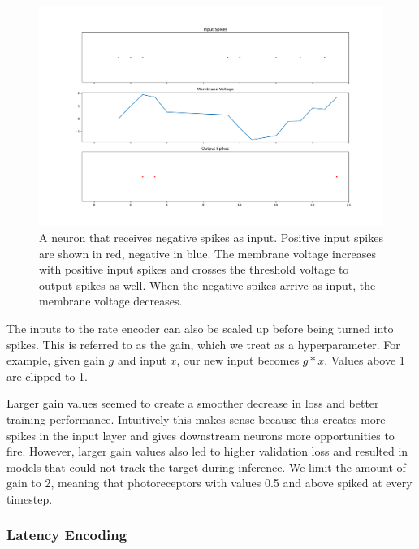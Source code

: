 \documentclass [MS] {UCLAthesis}
\begin{document}
\begin{figure}
    \centering
    \includegraphics[width=\textwidth]{negative_spike_example}
    \caption[Negative spike inputs to a LIF neuron]{A neuron that receives negative spikes as input. Positive input spikes are shown in red, negative in blue. The membrane voltage increases with positive input spikes and crosses the threshold voltage to output spikes as well. When the negative spikes arrive as input, the membrane voltage decreases.}
    \label{fig:negative_spike_example}
\end{figure}

The inputs to the rate encoder can also be scaled up before being turned into spikes. This is referred to as the gain, which we treat as a hyperparameter. For example, given gain $g$ and input $x$, our new input becomes $g*x$. Values above 1 are clipped to 1.

Larger gain values seemed to create a smoother decrease in loss and better training performance. Intuitively this makes sense because this creates more spikes in the input layer and gives downstream neurons more opportunities to fire. However, larger gain values also led to higher validation loss and resulted in models that could not track the target during inference. We limit the amount of gain to 2, meaning that photoreceptors with values 0.5 and above spiked at every timestep.



\subsubsection{Latency Encoding}
\end{document}

